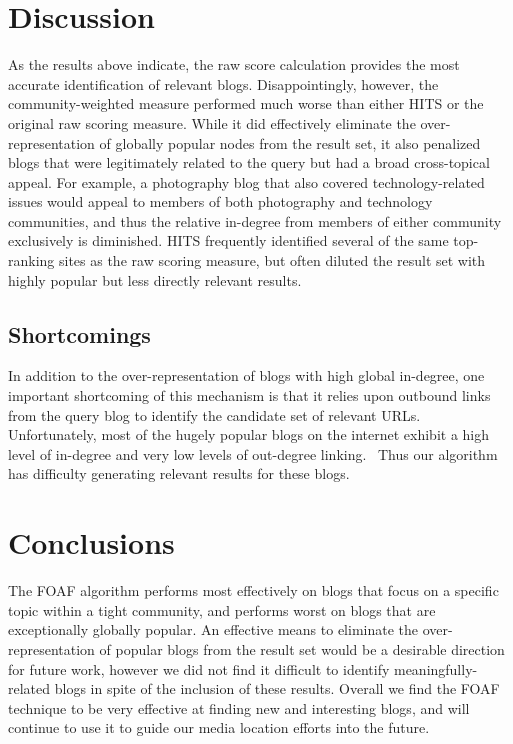 \documentclass{sig-alternate}
\begin{document}
\section{Discussion}
As the results above indicate, the raw score calculation provides the
most accurate identification of relevant blogs.  Disappointingly,
however, the community-weighted measure performed much worse than
either HITS or the original raw scoring measure.  While it did
effectively eliminate the over-representation of globally popular
nodes from the result set, it also penalized blogs that were
legitimately related to the query but had a broad cross-topical
appeal.  For example, a photography blog that also covered
technology-related issues would appeal to members of both photography
and technology communities, and thus the relative in-degree from
members of either community exclusively is diminished.  HITS
frequently identified several of the same top-ranking sites as the raw
scoring measure, but often diluted the result set with highly popular
but less directly relevant results.

\subsection{Shortcomings}
In addition to the over-representation of blogs with high global
in-degree, one important shortcoming of this mechanism is that it
relies upon outbound links from the query blog to identify the
candidate set of relevant URLs.  Unfortunately, most of the hugely
popular blogs on the internet exhibit a high level of in-degree and
very low levels of out-degree linking.~\cite{convBlog}  Thus our algorithm has
difficulty generating relevant results for these blogs.

\section{Conclusions}


The FOAF algorithm performs most effectively on blogs that focus on a
specific topic within a tight community, and performs worst on blogs
that are exceptionally globally popular.  An effective
means to eliminate the over-representation of popular blogs from the
result set would be a desirable direction for future work, however we
did not find it difficult to identify meaningfully-related
blogs in spite of the inclusion of these results. Overall we find the
FOAF technique to be very effective at finding new and interesting
blogs, and will continue to use it to guide our media location efforts
into the future.
\end{document}
